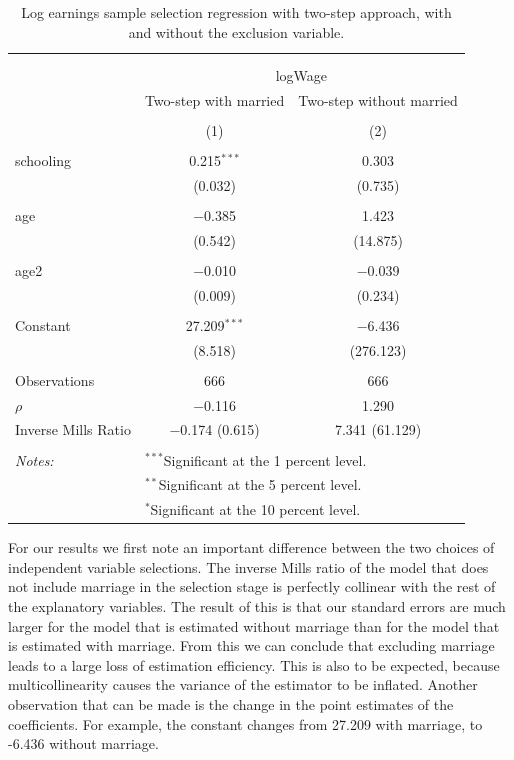 \documentclass[
]{article}
\begin{document}
\begin{table}[!htbp] \centering 
  \caption{Log earnings sample selection regression with two-step approach, 
          with and without the exclusion variable.} 
  \label{tab:q1_d} 
\small 
\begin{tabular}{@{\extracolsep{5pt}}lcc} 
\\[-1.8ex]\hline 
\hline \\[-1.8ex] 
\\[-1.8ex] & \multicolumn{2}{c}{logWage} \\ 
 & Two-step with married & Two-step without married \\ 
\\[-1.8ex] & (1) & (2)\\ 
\hline \\[-1.8ex] 
 schooling & 0.215$^{***}$ & 0.303 \\ 
  & (0.032) & (0.735) \\ 
  & & \\ 
 age & $-$0.385 & 1.423 \\ 
  & (0.542) & (14.875) \\ 
  & & \\ 
 age2 & $-$0.010 & $-$0.039 \\ 
  & (0.009) & (0.234) \\ 
  & & \\ 
 Constant & 27.209$^{***}$ & $-$6.436 \\ 
  & (8.518) & (276.123) \\ 
  & & \\ 
Observations & 666 & 666 \\ 
$\rho$ & $-$0.116 & 1.290 \\ 
Inverse Mills Ratio & $-$0.174  (0.615) & 7.341  (61.129) \\ 
\hline \\[-1.8ex] 
\textit{Notes:} & \multicolumn{2}{l}{$^{***}$Significant at the 1 percent level.} \\ 
 & \multicolumn{2}{l}{$^{**}$Significant at the 5 percent level.} \\ 
 & \multicolumn{2}{l}{$^{*}$Significant at the 10 percent level.} \\ 
\end{tabular} 
\end{table}

For our results we first note an important difference between the two
choices of independent variable selections. The inverse Mills ratio of
the model that does not include marriage in the selection stage is
perfectly collinear with the rest of the explanatory variables. The
result of this is that our standard errors are much larger for the model
that is estimated without marriage than for the model that is estimated
with marriage. From this we can conclude that excluding marriage leads
to a large loss of estimation efficiency. This is also to be expected,
because multicollinearity causes the variance of the estimator to be
inflated. Another observation that can be made is the change in the
point estimates of the coefficients. For example, the constant changes
from 27.209 with marriage, to -6.436 without marriage.
\end{document}
